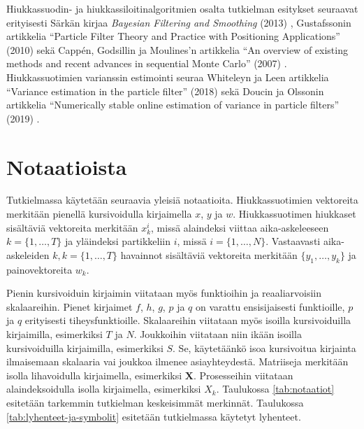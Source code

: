 \documentclass[
  12pt,
  a4paper, twoside]{book}
\begin{document}
Hiukkassuodin- ja hiukkassiloitinalgoritmien osalta tutkielman esitykset seuraavat erityisesti Särkän kirjaa \textit{Bayesian Filtering and Smoothing} (2013) \citep{sarkka-2013}, Gustafssonin artikkelia ``Particle Filter Theory and Practice with Positioning Applications'' (2010) \citep{gustafsson-2010} sekä Cappén, Godsillin ja Moulines'n artikkelia ``An overview of existing methods and recent advances in sequential Monte Carlo'' (2007) \citep{cappe-2007}. Hiukkassuotimien varianssin estimointi seuraa Whiteleyn ja Leen artikkelia ``Variance estimation in the particle filter'' (2018) \citep{Lee-2018} sekä Doucin ja Olssonin artikkelia ``Numerically stable online estimation of variance in particle filters'' (2019) \citep{olsson-2019}.

\section{Notaatioista}

Tutkielmassa käytetään seuraavia yleisiä notaatioita. Hiukkassuotimien vektoreita merkitään pienellä kursivoidulla kirjaimella \(x\), \(y\) ja \(w\). Hiukkassuotimen hiukkaset sisältäviä vektoreita merkitään \(x_k^i\), missä alaindeksi viittaa aika-askeleeseen \(k=\{1,\ldots,T\}\) ja yläindeksi partikkeliin \(i\), missä \(i=\{1,\ldots,N\}\). Vastaavasti aika-askeleiden \(k, k=\{1,\ldots,T\}\) havainnot sisältäviä vektoreita merkitään \(\{y_1,\ldots,y_k\}\) ja painovektoreita \(w_k\).

Pienin kursivoiduin kirjaimin viitataan myös funktioihin ja reaaliarvoisiin skalaareihin. Pienet kirjaimet \(f\), \(h\), \(g\), \(p\) ja \(q\) on varattu ensisijaisesti funktioille, \(p\) ja \(q\) erityisesti tiheysfunktioille. Skalaareihin viitataan myös isoilla kursivoiduilla kirjaimilla, esimerkiksi \(T\) ja \(N\). Joukkoihin viitataan niin ikään isoilla kursivoiduilla kirjaimilla, esimerkiksi \(S\). Se, käytetäänkö isoa kursivoitua kirjainta ilmaisemaan skalaaria vai joukkoa ilmenee asiayhteydestä. Matriiseja merkitään isolla lihavoidulla kirjaimella, esimerkiksi \(\mathbf{X}\). Prosesseihin viitataan alaindeksoidulla isolla kirjaimella, esimerkiksi \(X_k\). Taulukossa \ref{tab:notaatiot} esitetään tarkemmin tutkielman keskeisimmät merkinnät. Taulukossa \ref{tab:lyhenteet-ja-symbolit} esitetään tutkielmassa käytetyt lyhenteet.
\end{document}
